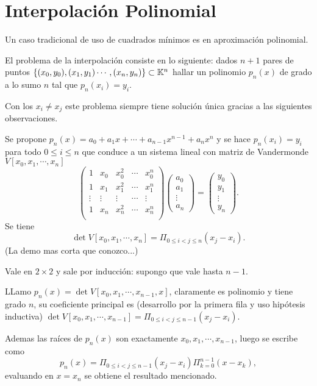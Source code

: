 \section{Interpolación Polinomial}
Un caso tradicional de uso de cuadrados mínimos es en aproximación polinomial.

El problema de la interpolación consiste en lo siguiente: dados $n+1$ pares de puntos $\{(x_{0},y_{0}),(x_{1},y_{1})\cdots ,(x_{n},y_{n})\}\subset \mathbb K^{n}$ hallar un polinomio $p_{n}(x)$ de grado a lo sumo $n$ tal que $p_{n}(x_{i})=y_{i}$.


Con los $x_{i}\neq x_{j}$ este problema siempre tiene solución única gracias a las siguientes observaciones.



 Se propone $p_{n}(x)=a_{0}+ a_{1}x+\cdots +a_{n-1}x^{n-1} +a_{n}x^{n}$ y se hace $p_{n}(x_{i})=y_{i}$ para todo $0\le i\le n$ que conduce a un sistema lineal con matriz de Vandermonde $V[x_0,x_1,\cdots,x_n]$
 $$
 \begin{pmatrix}
 1&x_{0}&x_{0}^{2}&\cdots &x_{0}^{n}\\
 1&x_{1}&x_{1}^{2}&\cdots &x_{1}^{n}\\
 \vdots&\vdots&\vdots&\cdots&\vdots\\
 1&x_{n}&x_{n}^{2}&\cdots &x_{n}^{n}\\
 \end{pmatrix}
 \begin{pmatrix}
 a_{0}\\
 a_{1}\\
 \vdots\\
 a_{n}
 \end{pmatrix}=
 \begin{pmatrix}
y_{0}\\
 y_{1}\\
 \vdots\\
 y_{n}
 \end{pmatrix}.
 $$
 Se tiene
 $$
 \det V[x_0,x_1,\cdots,x_n]=\Pi_{0\le i<j\le n}(x_j-x_i).
 $$
 (La demo mas corta que conozco...)

 Vale en $2\times 2$ y sale por inducción: supongo que vale hasta $n-1$.

 LLamo
 $p_n(x)=\det V[x_0,x_1,\cdots,x_{n-1},x]$, claramente es polinomio y tiene grado $n$, su coeficiente principal es (desarrollo por la primera fila y uso hipótesis inductiva) $\det V[x_0,x_1,\cdots,x_{n-1}]=\Pi_{0\le i<j\le n-1}(x_j-x_i)$.

  Ademas las raíces de $p_n(x)$ son exactamente $x_0,x_1,\cdots, x_{n-1}$, luego se escribe como
 $$
 p_n(x)=\Pi_{0\le i<j\le n-1}(x_j-x_i)\Pi_{k=0}^{n-1}(x-x_k),
 $$
 evaluando en $x=x_n$ se obtiene el resultado mencionado.

